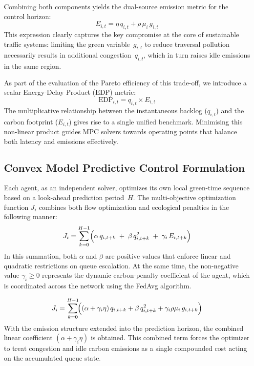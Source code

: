 \documentclass[journal]{IEEEtran}
\begin{document}
Combining both components yields the dual-source emission metric for the control horizon:
\begin{equation}
    E_{i,t} = \eta\, q_{i,t} + \rho\, \mu_i\, g_{i,t}
    \label{eq:emission_combined}
\end{equation}
This expression clearly captures the key compromise at the core of sustainable traffic systems: limiting the green variable~$g_{i,t}$ to reduce traversal pollution necessarily results in additional congestion~$q_{i,t}$, which in turn raises idle emissions in the same region.

As part of the evaluation of the Pareto efficiency of this trade-off, we introduce a scalar Energy-Delay Product ($\mathrm{EDP}$) metric:
\begin{equation}
    \mathrm{EDP}_{i,t} = q_{i,t} \times E_{i,t}
    \label{eq:edp}
\end{equation}
The multiplicative relationship between the instantaneous backlog ($q_{i,t}$) and the carbon footprint ($E_{i,t}$) gives rise to a single unified benchmark. Minimising this non-linear product guides MPC solvers towards operating points that balance both latency and emissions effectively.

\subsection{Convex Model Predictive Control Formulation}
Each agent, as an independent solver, optimizes its own local green-time sequence based on a look-ahead prediction period~$H$. The multi-objective optimization function $J_i$ combines both flow optimization and ecological penalties in the following manner:
\begin{equation}
    J_i = \sum_{k=0}^{H-1}
          \Bigl(\alpha\, q_{i,t+k}\;+\;\beta\, q_{i,t+k}^{2}\;+\;\gamma_i\, E_{i,t+k}\Bigr)
    \label{eq:objective}
\end{equation}
In this summation, both $\alpha$ and $\beta$ are positive values that enforce linear and quadratic restrictions on queue escalation. At the same time, the non-negative value $\gamma_i \geq 0$ represents the dynamic carbon-penalty coefficient of the agent, which is coordinated across the network using the FedAvg algorithm.

\begin{equation}
    J_i = \sum_{k=0}^{H-1} \!\Bigl(
          (\alpha + \gamma_i \eta)\,q_{i,t+k}
          + \beta\,q_{i,t+k}^{2}
          + \gamma_i \rho \mu_i\,g_{i,t+k}
    \Bigr)
    \label{eq:objective_expanded}
\end{equation}
With the emission structure extended into the prediction horizon, the combined linear coefficient $(\alpha + \gamma_i\eta)$ is obtained. This combined term forces the optimizer to treat congestion and idle carbon emissions as a single compounded cost acting on the accumulated queue state.
\end{document}

